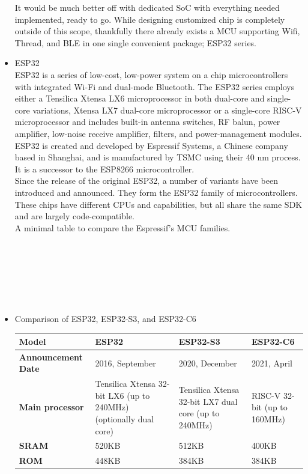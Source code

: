 \documentclass[conference]{IEEEtran}
\begin{document}
\begin{itemize}
It would be much better off with dedicated SoC with everything needed implemented, ready to go. While designing customized chip is completely outside of this scope, thankfully there already exists a MCU supporting Wifi, Thread, and BLE in one single convenient package; ESP32 series.\\
\item ESP32\\
ESP32 is a series of low-cost, low-power system on a chip microcontrollers with integrated Wi-Fi and dual-mode Bluetooth. The ESP32 series employs either a Tensilica Xtensa LX6 microprocessor in both dual-core and single-core variations, Xtensa LX7 dual-core microprocessor or a single-core RISC-V microprocessor and includes built-in antenna switches, RF balun, power amplifier, low-noise receive amplifier, filters, and power-management modules. ESP32 is created and developed by Espressif Systems, a Chinese company based in Shanghai, and is manufactured by TSMC using their 40 nm process. It is a successor to the ESP8266 microcontroller.\\
Since the release of the original ESP32, a number of variants have been introduced and announced. They form the ESP32 family of microcontrollers. These chips have different CPUs and capabilities, but all share the same SDK and are largely code-compatible.\\
A minimal table to compare the Espressif's MCU families.\\
\\\\\\\\\\\\
\item Comparison of ESP32, ESP32-S3, and ESP32-C6
\setlength{\extrarowheight}{2.5pt}
\begin{table}[H]
\centering
\begin{tabular}{|m{1.8cm}|m{1.8cm}|m{1.8cm}|m{1.8cm}|}
\hline
\textbf{Model} & \textbf{ESP32} & \textbf{ESP32-S3} & \textbf{ESP32-C6} \\
\hline
\textbf{Announcement Date} & 2016, September & 2020, December & 2021, April \\
\textbf{Main processor} & Tensilica Xtensa 32-bit LX6 (up to 240MHz) (optionally dual core) & Tensilica Xtensa 32-bit LX7 dual core (up to 240MHz) & RISC-V 32-bit (up to 160MHz) \\
\textbf{SRAM} & 520KB & 512KB & 400KB \\
\textbf{ROM} & 448KB & 384KB & 384KB \\

\end{tabular}
\end{table}
\end{itemize}
\end{document}
